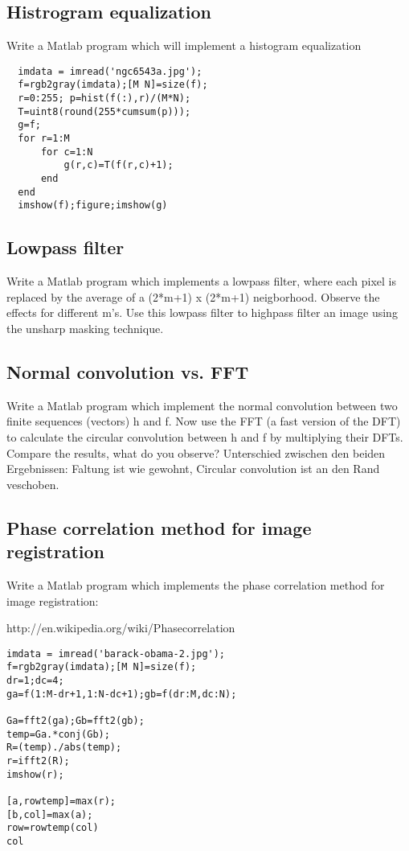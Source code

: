\subsection{Histrogram equalization}
Write a Matlab program which will implement a histogram equalization
\begin{lstlisting}
  imdata = imread('ngc6543a.jpg');
  f=rgb2gray(imdata);[M N]=size(f);
  r=0:255; p=hist(f(:),r)/(M*N);
  T=uint8(round(255*cumsum(p)));
  g=f;
  for r=1:M
      for c=1:N
          g(r,c)=T(f(r,c)+1);
      end
  end
  imshow(f);figure;imshow(g)
\end{lstlisting}
\subsection{Lowpass filter}
Write a Matlab program which implements a lowpass filter, where each pixel is
replaced by the average of a (2*m+1) x (2*m+1) neigborhood. Observe the effects for different m's. Use this lowpass filter to highpass filter an image using the unsharp masking technique. 
\subsection{Normal convolution vs. FFT}
Write a Matlab program which implement the normal convolution between two finite
sequences (vectors) h and f. Now use the FFT (a fast version of the DFT) to calculate the circular convolution between h and f by multiplying their DFTs. Compare the results, what do you observe?
Unterschied zwischen den beiden Ergebnissen: Faltung ist wie gewohnt, Circular convolution ist an den Rand veschoben.


\subsection{Phase correlation method for image registration}
Write a Matlab program which implements the phase correlation method for image
registration:

http://en.wikipedia.org/wiki/Phase\textunderscore correlation

\begin{lstlisting}
imdata = imread('barack-obama-2.jpg');
f=rgb2gray(imdata);[M N]=size(f);
dr=1;dc=4;
ga=f(1:M-dr+1,1:N-dc+1);gb=f(dr:M,dc:N);

Ga=fft2(ga);Gb=fft2(gb);
temp=Ga.*conj(Gb);
R=(temp)./abs(temp);
r=ifft2(R);
imshow(r);

[a,rowtemp]=max(r);
[b,col]=max(a);
row=rowtemp(col)
col
\end{lstlisting}
